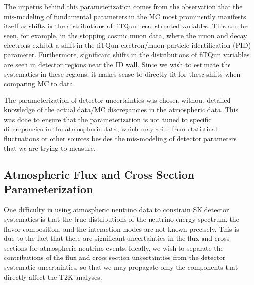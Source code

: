 The impetus behind this parameterization comes from the observation that the
mis-modeling of fundamental parameters in the MC most prominently manifests
itself as shifts in the distributions of fiTQun reconstructed variables. This
can be seen, for example, in the stopping cosmic muon data, where the muon and
decay electrons exhibit a shift in the fiTQun electron/muon particle
identification (PID) parameter.  Furthermore, significant shifts in the
distributions of fiTQun variables are seen in detector regions near the ID
wall.  Since we wish to estimate the systematics in these regions, it makes
sense to directly fit for these shifts when comparing MC to data. 


The parameterization of detector uncertainties was chosen without detailed
knowledge of the actual data/MC discrepancies in the atmospheric data.  This
was done to ensure that the parameterization is not tuned to specific
discrepancies in the atmospheric data, which may arise from statistical
fluctuations or other sources besides the mis-modeling of detector parameters
that we are trying to measure.  



\subsection{Atmospheric Flux and Cross Section Parameterization}
\label{subsec:alphapar}

One difficulty in using atmospheric neutrino data to constrain SK detector
systematics is that the true distributions of the neutrino energy spectrum, the
flavor composition, and the interaction modes are not known precisely.  This is
due to the fact that there are significant uncertainties in the flux and cross
sections for atmospheric neutrino events.  Ideally, we wish to separate the
contributions of the flux and cross section uncertainties from the detector
systematic uncertainties, so that we may propagate only the components that
directly affect the T2K analyses. 

